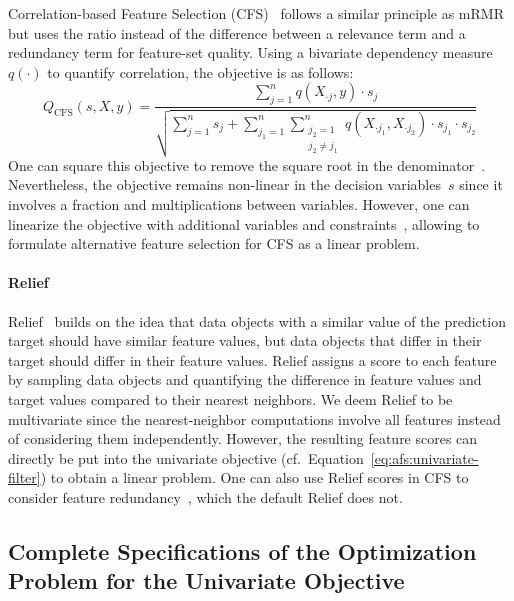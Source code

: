 \documentclass{article}
\theoremstyle{definition}
\begin{document}
Correlation-based Feature Selection (CFS)~\cite{hall1999correlation, hall2000correlation} follows a similar principle as mRMR but uses the ratio instead of the difference between a relevance term and a redundancy term for feature-set quality.
Using a bivariate dependency measure $q(\cdot)$ to quantify correlation, the objective is as follows:
%
\begin{equation}
	Q_{\text{CFS}}(s,X,y) = \frac{\sum_{j=1}^{n} q(X_{\cdot{}j},y) \cdot s_j}{\sqrt{\sum_{j=1}^{n} s_j + \sum_{j_1=1}^{n} \sum_{\substack{j_2=1 \\ j_2 \neq j_1}}^{n} q(X_{\cdot{}j_1}, X_{\cdot{}j_2}) \cdot s_{j_1} \cdot s_{j_2}}}
	\label{eq:afs:cfs}
\end{equation}
%
One can square this objective to remove the square root in the denominator~\cite{nguyen2010towards}.
Nevertheless, the objective remains non-linear in the decision variables~$s$ since it involves a fraction and multiplications between variables.
However, one can linearize the objective with additional variables and constraints~\cite{nguyen2010improving, nguyen2010towards}, allowing to formulate alternative feature selection for CFS as a linear problem.

\paragraph{Relief}

Relief~\cite{kira1992feature, robnik1997adaptation} builds on the idea that data objects with a similar value of the prediction target should have similar feature values, but data objects that differ in their target should differ in their feature values.
Relief assigns a score to each feature by sampling data objects and quantifying the difference in feature values and target values compared to their nearest neighbors.
We deem Relief to be multivariate since the nearest-neighbor computations involve all features instead of considering them independently.
However, the resulting feature scores can directly be put into the univariate objective (cf.~Equation~\ref{eq:afs:univariate-filter}) to obtain a linear problem.
One can also use Relief scores in CFS to consider feature redundancy~\cite{hall1999correlation, hall2000correlation}, which the default Relief does not.

\subsection{Complete Specifications of the Optimization Problem for the Univariate Objective}
\label{sec:afs:appendix:univariate-complete-optimization-problem}
\end{document}
